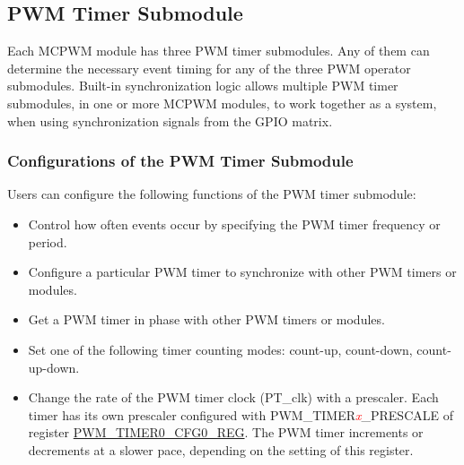 \documentclass[main\_\_EN.tex]{subfiles}
\begin{document}
\subsection{PWM Timer Submodule}
\label{section:timer_sub}
Each MCPWM module has three PWM timer submodules. Any of them can determine the necessary event timing for any of the three PWM operator submodules. Built-in synchronization logic allows multiple PWM timer submodules, in one or more MCPWM modules, to work together as a system, when using synchronization signals from the GPIO matrix.

\subsubsection{Configurations of the PWM Timer Submodule}

Users can configure the following functions of the PWM timer submodule:

\begin{itemize}
    \item Control how often events occur by specifying the PWM timer frequency or period.
    \item Configure a particular PWM timer to synchronize with other PWM timers or modules.
    \item Get a PWM timer in phase with other PWM timers or modules.
    \item Set one of the following timer counting modes: count-up, count-down, count-up-down.
    \item Change the rate of the PWM timer clock (PT\_clk) with a prescaler. Each timer has its own prescaler configured with PWM\_TIMER\textcolor{red}{\it{x}}\_PRESCALE of register \hyperref[regdesc:PWMTIMER0CFG0REG]{PWM\_TIMER0\_CFG0\_REG}. The PWM timer increments or decrements at a slower pace, depending on the setting of this register.
\end{itemize}
\end{document}
